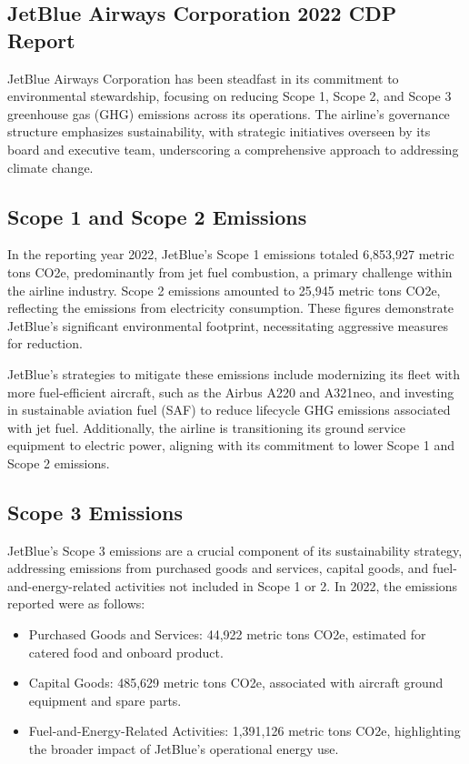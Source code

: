 \subsection{JetBlue Airways Corporation 2022 CDP Report}
JetBlue Airways Corporation has been steadfast in its commitment to environmental stewardship, focusing on reducing Scope 1, Scope 2, and Scope 3 greenhouse gas (GHG) emissions across its operations. The airline's governance structure emphasizes sustainability, with strategic initiatives overseen by its board and executive team, underscoring a comprehensive approach to addressing climate change.

\subsection*{Scope 1 and Scope 2 Emissions}
In the reporting year 2022, JetBlue's Scope 1 emissions totaled 6,853,927 metric tons CO2e, predominantly from jet fuel combustion, a primary challenge within the airline industry. Scope 2 emissions amounted to 25,945 metric tons CO2e, reflecting the emissions from electricity consumption. These figures demonstrate JetBlue's significant environmental footprint, necessitating aggressive measures for reduction.

\noindent JetBlue's strategies to mitigate these emissions include modernizing its fleet with more fuel-efficient aircraft, such as the Airbus A220 and A321neo, and investing in sustainable aviation fuel (SAF) to reduce lifecycle GHG emissions associated with jet fuel. Additionally, the airline is transitioning its ground service equipment to electric power, aligning with its commitment to lower Scope 1 and Scope 2 emissions.

\subsection*{Scope 3 Emissions}
JetBlue's Scope 3 emissions are a crucial component of its sustainability strategy, addressing emissions from purchased goods and services, capital goods, and fuel-and-energy-related activities not included in Scope 1 or 2. In 2022, the emissions reported were as follows:

\begin{itemize}
    \item Purchased Goods and Services: 44,922 metric tons CO2e, estimated for catered food and onboard product.
    \item Capital Goods: 485,629 metric tons CO2e, associated with aircraft ground equipment and spare parts.
    \item Fuel-and-Energy-Related Activities: 1,391,126 metric tons CO2e, highlighting the broader impact of JetBlue's operational energy use.
\end{itemize}

